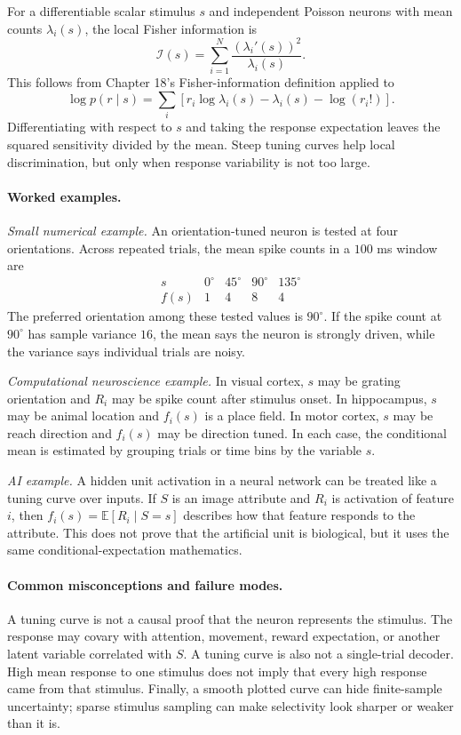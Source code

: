 For a differentiable scalar stimulus \(s\) and independent Poisson neurons with mean counts \(\lambda_i(s)\), the local Fisher information is
\[
\boxed{
\mathcal I(s)=\sum_{i=1}^N \frac{(\lambda_i'(s))^2}{\lambda_i(s)}.
}
\]
This follows from Chapter 18's Fisher-information definition applied to
\[
\log p(r\mid s)=\sum_i \left[r_i\log \lambda_i(s)-\lambda_i(s)-\log(r_i!)\right].
\]
Differentiating with respect to \(s\) and taking the response expectation leaves the squared sensitivity divided by the mean. Steep tuning curves help local discrimination, but only when response variability is not too large.

\paragraph{Worked examples.}
\emph{Small numerical example.}
An orientation-tuned neuron is tested at four orientations. Across repeated trials, the mean spike counts in a \(100\) ms window are
\[
\begin{array}{c|cccc}
s & 0^\circ & 45^\circ & 90^\circ & 135^\circ\\
\hline
f(s) & 1 & 4 & 8 & 4
\end{array}
\]
The preferred orientation among these tested values is \(90^\circ\). If the spike count at \(90^\circ\) has sample variance \(16\), the mean says the neuron is strongly driven, while the variance says individual trials are noisy.

\emph{Computational neuroscience example.}
In visual cortex, \(s\) may be grating orientation and \(R_i\) may be spike count after stimulus onset. In hippocampus, \(s\) may be animal location and \(f_i(s)\) is a place field. In motor cortex, \(s\) may be reach direction and \(f_i(s)\) may be direction tuned. In each case, the conditional mean is estimated by grouping trials or time bins by the variable \(s\).

\emph{AI example.}
A hidden unit activation in a neural network can be treated like a tuning curve over inputs. If \(S\) is an image attribute and \(R_i\) is activation of feature \(i\), then \(f_i(s)=\mathbb E[R_i\mid S=s]\) describes how that feature responds to the attribute. This does not prove that the artificial unit is biological, but it uses the same conditional-expectation mathematics.

\paragraph{Common misconceptions and failure modes.}
A tuning curve is not a causal proof that the neuron represents the stimulus. The response may covary with attention, movement, reward expectation, or another latent variable correlated with \(S\). A tuning curve is also not a single-trial decoder. High mean response to one stimulus does not imply that every high response came from that stimulus. Finally, a smooth plotted curve can hide finite-sample uncertainty; sparse stimulus sampling can make selectivity look sharper or weaker than it is.

